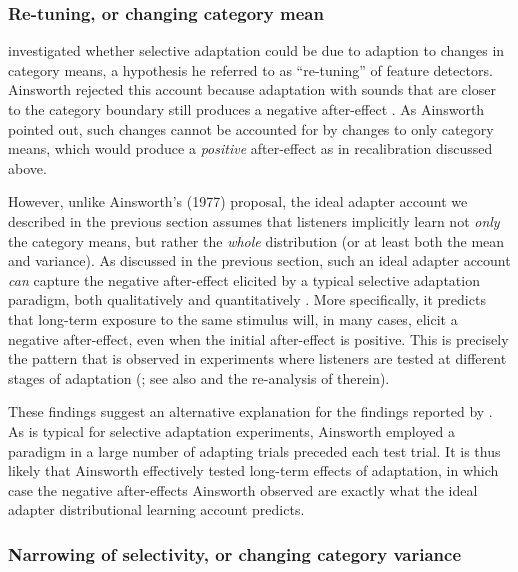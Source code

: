 \subsubsection{Re-tuning, or changing category mean}
\label{sec:re-tuning-or}

 investigated whether selective adaptation could be due to adaption to changes in category means, a hypothesis he referred to as ``re-tuning'' of feature detectors.  Ainsworth rejected this account because adaptation with sounds that are closer to the category boundary still produces a negative after-effect \cite{Ainsworth1977}.  As Ainsworth pointed out, such changes cannot be accounted for by changes to only category means, which would produce a \emph{positive} after-effect as in recalibration discussed above.  

\label{r2-whole-distribution-2}
However, unlike Ainsworth's (1977) proposal, the ideal adapter account we described in the previous section assumes that listeners implicitly learn not \emph{only} the category means, but rather the {\em whole} distribution (or at least both the mean and variance). As discussed in the previous section, such an ideal adapter account {\em can} capture the negative after-effect elicited by a typical selective adaptation paradigm, both qualitatively and quantitatively \cite{Kleinschmidt2015}. More specifically, it predicts that long-term exposure to the same stimulus will, in many cases, elicit a negative after-effect, even when the initial after-effect is positive.  This is precisely the pattern that is observed in experiments where listeners are tested at different stages of adaptation (; see also  and the re-analysis of  therein).

These findings suggest an alternative explanation for the findings reported by . As is typical for selective adaptation experiments, Ainsworth employed a paradigm in a large number of adapting trials preceded each test trial. It is thus likely that Ainsworth effectively tested long-term effects of adaptation, in which case the negative after-effects Ainsworth observed are exactly what the ideal adapter distributional learning account predicts.

\subsubsection{Narrowing of selectivity, or changing category variance}
\label{sec:narr-select-or}

